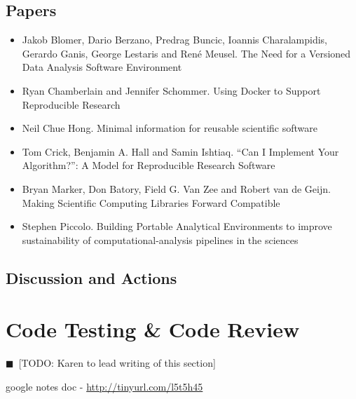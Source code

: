 \documentclass[11pt, oneside]{amsart}
\newcommand{\todo}[1]{{\color{blue}$\blacksquare$~\textsf{[TODO: #1]}}}
\begin{document}
\subsection{Papers}
\begin{itemize}
\item Jakob Blomer, Dario Berzano, Predrag Buncic, Ioannis Charalampidis,
Gerardo Ganis, George Lestaris and Ren\'{e} Meusel. The Need for a Versioned
Data Analysis Software Environment~\cite{wssspe2_blomer}

\item Ryan Chamberlain and Jennifer Schommer. Using {Docker} to Support
Reproducible Research~\cite{wssspe2_chamberlain}

\item Neil Chue Hong. Minimal information for reusable scientific
software~\cite{wssspe2_chue_hong}

\item Tom Crick, Benjamin A. Hall and Samin Ishtiaq. ``Can I Implement Your
Algorithm?'': A Model for Reproducible Research Software~\cite{wssspe2_crick}

\item Bryan Marker, Don Batory, Field G. Van Zee and Robert van de Geijn. Making
Scientific Computing Libraries Forward Compatible~\cite{wssspe2_marker}

\item Stephen Piccolo. Building Portable Analytical Environments to improve
sustainability of computational-analysis pipelines in the
sciences~\cite{wssspe2_piccolo}
\end{itemize}

\subsection{Discussion and Actions}

\section{Code Testing \& Code Review}
\todo{Karen to lead writing of this section}

google notes doc - 
\url{http://tinyurl.com/l5t5h45}
\end{document}
